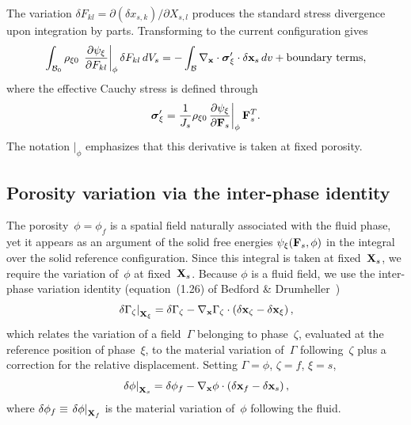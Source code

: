 \documentclass[11pt]{article}
\begin{document}
The variation $\delta F_{kl} = \partial(\delta x_{s,k})/\partial X_{s,l}$ produces the standard stress divergence upon integration by parts.  Transforming to the current configuration gives
\begin{equation*}
  \int_{\mathcal{B}_{0}} \rho_{\xi 0}\,\left.\frac{\partial \psi_\xi}{\partial F_{kl}}\right\vert_\phi \delta F_{kl}\, dV_s = -\int_{\mathcal{B}} \nabla_{\mathbf{x}} \cdot \boldsymbol{\sigma}'_\xi \cdot \delta\mathbf{x}_s \,dv + \text{boundary terms},
\end{equation*}
where the effective Cauchy stress is defined through
\begin{equation*}
  \boldsymbol{\sigma}'_\xi = \frac{1}{J_s} \rho_{\xi 0}\,\frac{\partial \psi_\xi}{\partial \mathbf{F}_s}\bigg\vert_\phi\, \mathbf{F}_s^T.
\end{equation*}
The notation $|_\phi$ emphasizes that this derivative is taken at fixed porosity.

\subsection{Porosity variation via the inter-phase identity}

The porosity~$\phi = \phi_f$ is a spatial field naturally associated with the fluid phase, yet it appears as an argument of the solid free energies $\psi_\xi(\mathbf{F}_s, \phi)$ in the integral over the solid reference configuration.  Since this integral is taken at fixed~$\mathbf{X}_s$, we require the variation of~$\phi$ at fixed~$\mathbf{X}_s$.  Because $\phi$ is a fluid field, we use the inter-phase variation identity (equation~(1.26) of Bedford \& Drumheller~\cite{bedford1983theories})
\begin{equation}
  \left.\delta\Gamma_{\zeta}\right|_{\mathbf{X}_{\xi}} = \delta\Gamma_{\zeta} - \nabla_{\mathbf{x}}\Gamma_{\zeta} \cdot \left(\delta\mathbf{x}_{\zeta} - \delta\mathbf{x}_{\xi}\right),
  \label{eq:BD_identity}
\end{equation}
which relates the variation of a field~$\Gamma$ belonging to phase~$\zeta$, evaluated at the reference position of phase~$\xi$, to the material variation of~$\Gamma$ following~$\zeta$ plus a correction for the relative displacement.  Setting $\Gamma = \phi$, $\zeta = f$, $\xi = s$,
\begin{equation}
  \left.\delta\phi\right|_{\mathbf{X}_s} = \delta\phi_f - \nabla_{\mathbf{x}}\phi \cdot \left(\delta\mathbf{x}_f - \delta\mathbf{x}_s\right),
  \label{eq:delta_phi}
\end{equation}
where $\delta\phi_f \equiv \left.\delta\phi\right|_{\mathbf{X}_f}$ is the material variation of~$\phi$ following the fluid.
\end{document}
